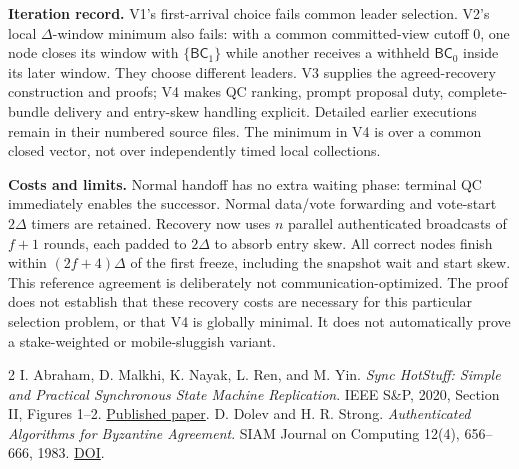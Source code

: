 \documentclass[10pt,a4paper]{article}
\newcommand{\BC}{\mathsf{BC}}
\begin{document}
\textbf{Iteration record.} V1's first-arrival choice fails common leader
selection. V2's local $\Delta$-window minimum also fails: with a common
committed-view cutoff 0, one node closes its window with $\{\BC_1\}$ while
another receives a withheld $\BC_0$ inside its later window. They choose
different leaders. V3 supplies the agreed-recovery construction and proofs;
V4 makes QC ranking, prompt proposal duty, complete-bundle delivery and
entry-skew handling explicit. Detailed earlier executions remain in their
numbered source files. The minimum in V4 is over a common closed vector,
not over independently timed local collections.

\textbf{Costs and limits.} Normal handoff has no extra waiting phase:
terminal QC immediately enables the successor. Normal data/vote forwarding
and vote-start $2\Delta$ timers are retained. Recovery now uses $n$ parallel
authenticated broadcasts of $f+1$ rounds, each padded to $2\Delta$ to absorb
entry skew. All correct nodes finish within
$(2f+4)\Delta$ of the first freeze, including the snapshot wait and start
skew. This reference agreement is deliberately not communication-optimized.
The proof does not establish that these recovery costs are necessary for
this particular selection problem, or that V4 is globally minimal. It does
not automatically prove a stake-weighted or mobile-sluggish variant.

\begin{thebibliography}{2}\small
{} I. Abraham, D. Malkhi, K. Nayak, L. Ren, and M. Yin.
\emph{Sync HotStuff: Simple and Practical Synchronous State Machine Replication}.
IEEE S\&P, 2020, Section II, Figures 1--2.
\href{https://conferences.computer.org/sp/pdfs/sp/2020/349700a106.pdf}{Published paper}.
 D. Dolev and H. R. Strong.
\emph{Authenticated Algorithms for Byzantine Agreement}.
SIAM Journal on Computing 12(4), 656--666, 1983.
\href{https://doi.org/10.1137/0212045}{DOI}.
\end{thebibliography}
\end{document}

